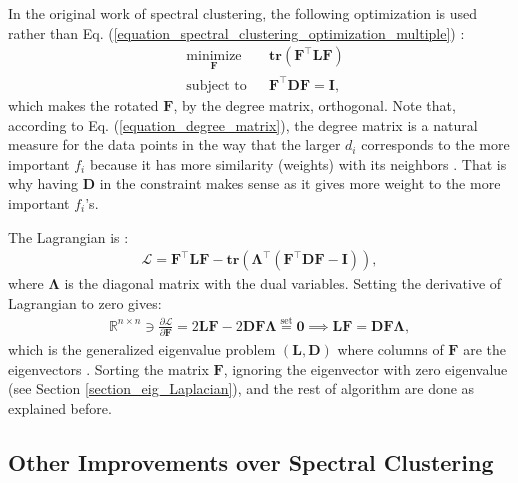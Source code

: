 \documentclass[lang=cn,10pt]{gorgeousnbook}
\numberwithin{equation}{section}%
\numberwithin{figure}{section}%
\begin{document}
In the original work of spectral clustering, the following optimization is used rather than Eq. (\ref{equation_spectral_clustering_optimization_multiple}) \cite{shi1997normalized}:
\begin{equation}\label{equation_spectral_clustering_optimization_multiple_2}
\begin{aligned}
& \underset{\boldsymbol{F}}{\text{minimize}}
& & \textbf{tr}(\boldsymbol{F}^\top \boldsymbol{L} \boldsymbol{F}) \\
& \text{subject to}
& & 
\boldsymbol{F}^\top \boldsymbol{D} \boldsymbol{F} = \boldsymbol{I},
\end{aligned}
\end{equation}
which makes the rotated $\boldsymbol{F}$, by the degree matrix, orthogonal. Note that, according to Eq. (\ref{equation_degree_matrix}), the degree matrix is a natural measure for the data points in the way that the larger $d_i$ corresponds to the more important $f_i$ because it has more similarity (weights) with its neighbors \cite{he2004locality}. That is why having $\boldsymbol{D}$ in the constraint makes sense as it gives more weight to the more important $f_i$'s.

The Lagrangian is \cite{boyd2004convex}:
\begin{align*}
\mathcal{L} = \boldsymbol{F}^\top \boldsymbol{L} \boldsymbol{F} - \textbf{tr}(\boldsymbol{\Lambda}^\top (\boldsymbol{F}^\top \boldsymbol{D} \boldsymbol{F} - \boldsymbol{I})),
\end{align*}
where $\boldsymbol{\Lambda}$ is the diagonal matrix with the dual variables. Setting the derivative of Lagrangian to zero gives:
\begin{align}
\mathbb{R}^{n \times n} \ni \frac{\partial \mathcal{L}}{\partial \boldsymbol{F}} = 2 \boldsymbol{L} \boldsymbol{F} - 2 \boldsymbol{D} \boldsymbol{F} \boldsymbol{\Lambda} \overset{\text{set}}{=} \boldsymbol{0} \implies \boldsymbol{L} \boldsymbol{F} = \boldsymbol{D} \boldsymbol{F} \boldsymbol{\Lambda},
\end{align}
which is the generalized eigenvalue problem $(\boldsymbol{L}, \boldsymbol{D})$ where columns of $\boldsymbol{F}$ are the eigenvectors \cite{ghojogh2019eigenvalue}. 
Sorting the matrix $\boldsymbol{F}$, ignoring the eigenvector with zero eigenvalue (see Section \ref{section_eig_Laplacian}), and the rest of algorithm are done as explained before. 


\subsection{Other Improvements over Spectral Clustering}
\end{document}
